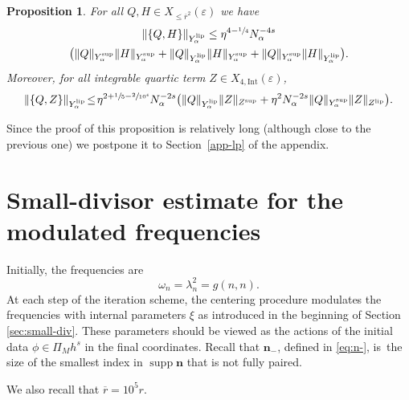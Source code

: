 \documentclass[10pt,a4paper]{amsart}
\theoremstyle{plain}
\newtheorem{proposition}[theorem]{Proposition}
\theoremstyle{definition}
\DeclareMathOperator{\supp}{supp}
\newcommand{\nb}{{\boldsymbol n}}
\newcommand{\1}{\mathbf{1}}
\newcommand{\Ysup}[1]{Y_{#1}^{\mathrm{sup}}}
\newcommand{\Ylip}[1]{Y_{#1}^{\mathrm{lip}}}
\let\epsilon\varepsilon
\begin{document}
\begin{proposition}\label{prop:bracket1} For all $Q,H\in X_{\leq\overline{r}^{2}}(\epsilon)$ we have
\begin{multline}
\label{eq:braket1-alpha}
\|\{Q,H\}\|_{\Ylip{\alpha}}
\leq
\eta^{4-\sfrac{1}{4}}N_{\alpha}^{-4s}\\
\big(
\|Q\|_{\Ysup{\alpha}}
\|H\|_{\Ysup{\alpha}}
+
\|Q\|_{\Ylip{\alpha}}
\|H\|_{\Ysup{\alpha}}
+
\|Q\|_{\Ysup{\alpha}}
\|H\|_{\Ylip{\alpha}}
\big).
\end{multline}
Moreover, for all integrable quartic term $Z\in X_{4,\mathrm{Int}}(\epsilon)$,
\begin{equation}
\label{eq:braket1-alpha-Z}
\|\{Q,Z\}\|_{\Ylip{\alpha}}
\!\leq\!
\eta^{2+\sfrac{1}{5}-\sfrac{2}{10^{4}}}
N_{\alpha}^{-2s}
\big(
\|Q\|_{\Ylip{\alpha}}
\|Z\|_{Z^{\mathrm{sup}}}
+
\eta^{2}N_{\alpha}^{-2s}
\|Q\|_{\Ysup{\alpha}}
\|Z\|_{Z^{\mathrm{lip}}}
\big).
\end{equation}
\end{proposition}

Since the proof of this proposition is relatively long (although close to the previous one) we postpone it to Section~\ref{app-lp} of the appendix.

\section{Small-divisor estimate for the modulated frequencies}\label{sec:smd}
Initially, the frequencies are
\[
\omega_n = \lambda_n^2=g(n,n).
\]
At each step of the iteration scheme, the centering procedure modulates the frequencies with internal parameters $\xi$ as introduced in the beginning of Section \ref{sec:small-div}. These parameters should be viewed as the actions of the initial data $\phi\in\Pi_{M}h^{s}$ in the final coordinates. Recall that $\nb_{-}$, defined in \eqref{eq:n-}, is~the size of the smallest index in $\supp\nb$ that is not fully paired.

We also recall that $\overline{r}=10^{5}r$.
\end{document}
